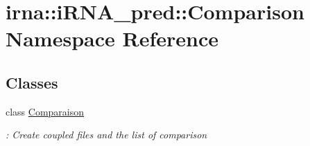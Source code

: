 \hypertarget{namespaceirna_1_1iRNA__pred_1_1Comparison}{
\section{irna\-:\-:i\-R\-N\-A\-\_\-pred\-:\-:\-Comparison \-Namespace \-Reference}
\label{namespaceirna_1_1iRNA__pred_1_1Comparison}
}
\subsection*{\-Classes}
\begin{DoxyCompactItemize}
\item 
class \hyperlink{classirna_1_1iRNA__pred_1_1Comparison_1_1Comparaison}{\-Comparaison}
\begin{DoxyCompactList}\small\item\em \-: \-Create coupled files and the list of comparison \end{DoxyCompactList}\end{DoxyCompactItemize}
